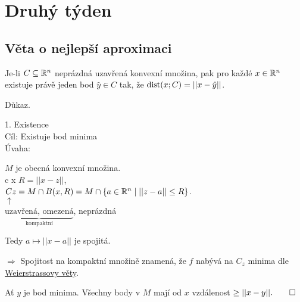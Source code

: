 \section{Druhý týden}

\subsection{Věta o nejlepší aproximaci}
Je-li $C \subseteq \mathbb{R}^n$ neprázdná uzavřená konvexní množina, pak pro každé $x \in \mathbb{R}^n$ existuje právě jeden bod 
$\hat y \in C$ tak, že $\operatorname*{dist} (x; C) = ||x-\hat y||$.

Důkaz.

1. Existence\\
Cíl: Existuje bod minima\\
Úvaha:
\begin{multicols}{2}


\columnbreak
    $M$ je obecná konvexní množina.\\c x
    $R = ||x-z||$,\\
    $Cz = M \cap B (x, R) = M \cap \left\lbrace a \in \mathbb{R}^n \mid ||z-a|| \leq R \right\rbrace$.\\
    $\uparrow$\\
    $\underbrace{\text{uzavřená, omezená}}_\text{kompaktní}$, neprázdná

    Tedy $a \mapsto ||x-a||$ je spojitá.

    $\Rightarrow$ Spojitost na kompaktní množině znamená, že $f$ nabývá na $C_z$ minima dle 
    \href{https://cs.wikipedia.org/wiki/Weierstrassova_v%C4%9Bta}{Weierstrassovy věty}.
\end{multicols}
Ať $y$ je bod minima. Všechny body v $M$ mají od $x$ vzdálenost $\geq ||x-y||. \qed$
\\

